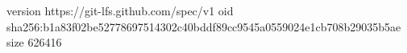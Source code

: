 version https://git-lfs.github.com/spec/v1
oid sha256:b1a83f02be52778697514302c40bddf89cc9545a0559024e1cb708b29035b5ae
size 626416
